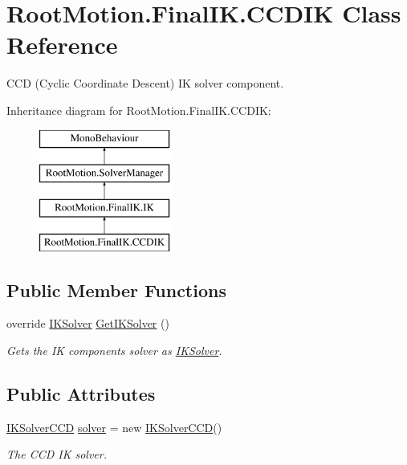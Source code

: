 \hypertarget{class_root_motion_1_1_final_i_k_1_1_c_c_d_i_k}{}\section{Root\+Motion.\+Final\+I\+K.\+C\+C\+D\+IK Class Reference}
\label{class_root_motion_1_1_final_i_k_1_1_c_c_d_i_k}


C\+CD (Cyclic Coordinate Descent) IK solver component.  


Inheritance diagram for Root\+Motion.\+Final\+I\+K.\+C\+C\+D\+IK\+:\begin{figure}[H]
\begin{center}
\leavevmode
\includegraphics[height=4.000000cm]{class_root_motion_1_1_final_i_k_1_1_c_c_d_i_k}
\end{center}
\end{figure}
\subsection*{Public Member Functions}
\begin{DoxyCompactItemize}
\item 
override \mbox{\hyperlink{class_root_motion_1_1_final_i_k_1_1_i_k_solver}{I\+K\+Solver}} \mbox{\hyperlink{class_root_motion_1_1_final_i_k_1_1_c_c_d_i_k_a0bed91571fde99f94e6cec73ca6db310}{Get\+I\+K\+Solver}} ()
\begin{DoxyCompactList}\small\item\em Gets the IK component\textquotesingle{}s solver as \mbox{\hyperlink{class_root_motion_1_1_final_i_k_1_1_i_k_solver}{I\+K\+Solver}}. \end{DoxyCompactList}\end{DoxyCompactItemize}
\subsection*{Public Attributes}
\begin{DoxyCompactItemize}
\item 
\mbox{\hyperlink{class_root_motion_1_1_final_i_k_1_1_i_k_solver_c_c_d}{I\+K\+Solver\+C\+CD}} \mbox{\hyperlink{class_root_motion_1_1_final_i_k_1_1_c_c_d_i_k_a0c05a77493ba07a331f33bb4d8d58821}{solver}} = new \mbox{\hyperlink{class_root_motion_1_1_final_i_k_1_1_i_k_solver_c_c_d}{I\+K\+Solver\+C\+CD}}()
\begin{DoxyCompactList}\small\item\em The C\+CD IK solver. \end{DoxyCompactList}\end{DoxyCompactItemize}
